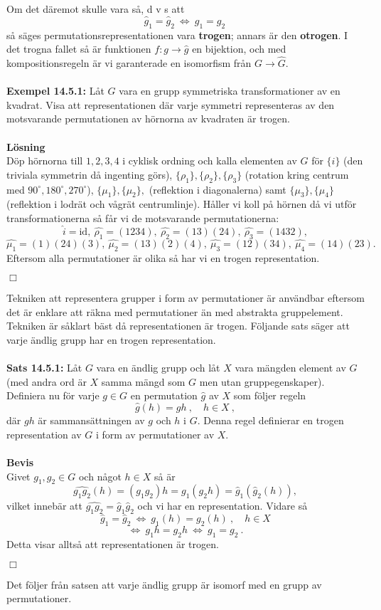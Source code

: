 \documentclass{article}
\begin{document}
Om det däremot skulle vara så, d v s att
$$
\hat{g}_1=\hat{g}_2 \  \Leftrightarrow \ g_1=g_2 \,
$$
så säges permutationsrepresentationen vara \textbf{trogen}; annars är den \textbf{otrogen}. I det trogna fallet så är funktionen $f:g\rightarrow \hat{g}$ en bijektion, och med kompositionsregeln är vi garanterade en isomorfism från $G\rightarrow\hat{G}$.
\\ \\
\textbf{Exempel 14.5.1:} Låt $G$ vara en grupp symmetriska transformationer av en kvadrat. Visa att representationen där varje symmetri representeras av den motsvarande permutationen av hörnorna av kvadraten är trogen.
\\ \\
\textbf{Lösning}
\\
Döp hörnorna till $1,2,3,4$ i cyklisk ordning och kalla elementen av $G$ för $\{i\}$ (den triviala symmetrin då ingenting görs), $\{\rho_1\},\{\rho_2\},\{\rho_3\}$ (rotation kring centrum med $90^{\circ},180^{\circ},270^{\circ}$), $\{\mu_1\},\{\mu_2\},$ (reflektion i diagonalerna) samt $\{\mu_3\},\{\mu_4\}$ (reflektion i lodrät och vågrät centrumlinje). Håller vi koll på hörnen då vi utför transformationerna så får vi de motsvarande permutationerna:
$$
\widehat{i}=\textrm{id}, \ \widehat{\rho_1}=(1234), \ \widehat{\rho_2}=(13)(24), \ \widehat{\rho_3}=(1432),
$$
$$
\widehat{\mu_1}=(1)(24)(3), \ \widehat{\mu_2}=(13)(2)(4), \ \widehat{\mu_3}=(12)(34), \  \widehat{\mu_4}=(14)(23).
$$
Eftersom alla permutationer är olika så har vi en trogen representation.
\begin{flushright}
$\Box$
\end{flushright}
Tekniken att representera grupper i form av permutationer är användbar eftersom det är enklare att räkna med permutationer än med abstrakta gruppelement. Tekniken är såklart bäst då representationen är trogen. Följande sats säger att varje ändlig grupp har en trogen representation.
\\ \\
\textbf{Sats 14.5.1:} Låt $G$ vara en ändlig grupp och låt $X$ vara mängden element av $G$ (med andra ord är $X$ samma mängd som $G$ men utan gruppegenskaper). Definiera nu för varje $g\in G$ en permutation $\hat{g}$ av $X$ som följer regeln
$$
\hat{g}(h)=gh \ , \quad h\in X \ ,
$$
där $gh$ är sammansättningen av $g$ och $h$ i $G$. Denna regel definierar en trogen representation av $G$ i form av permutationer av $X$.
\\ \\
\textbf{Bevis}
\\
Givet $g_1,g_2\in G$ och något $h\in X$ så är 
$$
\widehat{g_1g_2}(h)=(g_1g_2)h=g_1(g_2h)=\hat{g}_1(\hat{g}_2(h)),
$$
vilket innebär att $\widehat{g_1g_2}=\hat{g}_1\hat{g}_2$ och vi har en representation. Vidare så
$$
\hat{g}_1=\hat{g}_2 \ \Leftrightarrow \ g_1(h)=g_2(h) \ , \quad h\in X
$$
$$
\Leftrightarrow \ g_1h=g_2h \ \Leftrightarrow \ g_1=g_2 \ .
$$
Detta visar alltså att representationen är trogen.
\begin{flushright}
$\Box$
\end{flushright}
Det följer från satsen att varje ändlig grupp är isomorf med en grupp av permutationer. 
\end{document}
